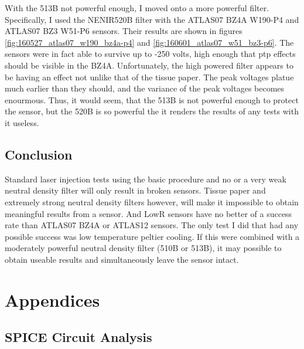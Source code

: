 \documentclass{report}
\begin{document}
            With the 513B not powerful enough, I moved onto a more powerful filter. Specifically, I used the NENIR520B filter with the ATLAS07 BZ4A W190-P4 and ATLAS07 BZ3 W51-P6 sensors. Their results are shown in figures \ref{fig:160527_atlas07_w190_bz4a-p4} and \ref{fig:160601_atlas07_w51_bz3-p6}. The sensors were in fact able to survive up to -250 volts, high enough that ptp effects should be visible in the BZ4A. Unfortunately, the high powered filter appears to be having an effect not unlike that of the tissue paper. The peak voltages platue much earlier than they should, and the variance of the peak voltages becomes enourmous. Thus, it would seem, that the 513B is not powerful enough to protect the sensor, but the 520B is so powerful the it renders the results of any tests with it useless.



        \section{Conclusion}
            Standard laser injection tests using the basic procedure and no or a very weak neutral density filter will only result in broken sensors. Tissue paper and extremely strong neutral density filters however, will make it impossible to obtain meaningful results from a sensor. And LowR sensors have no better of a success rate than ATLAS07 BZ4A or ATLAS12 sensors. The only test I did that had any possible success was low temperature peltier cooling. If this were combined with a moderately powerful neutral density filter (510B or 513B), it may possible to obtain useable results and simultaneously leave the sensor intact. 
            





    \chapter{Appendices}
        \section{SPICE Circuit Analysis}
\end{document}
